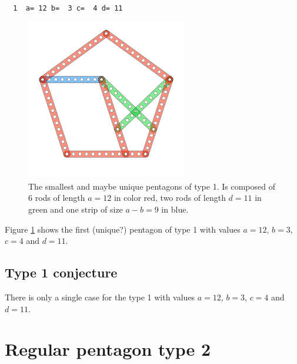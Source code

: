 \documentclass[11pt]{article}
\begin{document}
\begin{lstlisting}
  1  a= 12 b=  3 c=  4 d= 11
\end{lstlisting}

\begin{figure}[H] %
\centering
\includegraphics[width=7cm]{figs/pentagon-12a}
\caption{The smallest and maybe unique pentagons of type 1.
Is composed of 6 rods of length $a = 12$ in color red,
two rods of length $d=11$ in green and one strip of size $a-b = 9$ in blue.}
\label{pentagon-12a}
\end{figure}

Figure \ref{pentagon-12a} shows the first (unique?) pentagon of type 1 with values
$a=12$, $b=3$, $c=4$ and $d=11$.

\subsection{Type 1 conjecture}
There is only a single case for the type 1 with values $a=12$, $b=3$, $c=4$ and $d=11$.

\clearpage
\section{Regular pentagon type 2}
\end{document}
